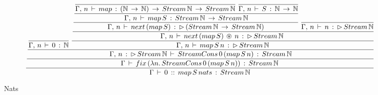 \begin{landscape}
\begin{figure}
\[
\cfrac { \cfrac { \cfrac { \cfrac {  }{ \Gamma ,\, n\, \vdash \, 0\, :\, \mathbb{N} } \, \, \cfrac { \cfrac { \cfrac { \cfrac { \cfrac {  }{ \Gamma ,\, n\, \vdash \, map\, :\, (\mathbb{N}\, \rightarrow \, \mathbb{N})\, \rightarrow \, Stream\, \mathbb{N}\, \rightarrow \, Stream\, \mathbb{N} } \, \, \cfrac {  }{ \Gamma ,\, n\, \vdash \, S\, :\, \mathbb{N}\, \rightarrow \, \mathbb{N} }  }{ \Gamma ,\, n\, \vdash \, map\, S\, :\, Stream\, \mathbb{N}\, \rightarrow \, Stream\, \mathbb{N} }  }{ \Gamma ,\, n\, \vdash \, next\, (map\, S)\, :\, \rhd \, (Stream\, \mathbb{N}\, \rightarrow \, Stream\, \mathbb{N}) } \, \, \cfrac {  }{ \Gamma ,\, n\, \vdash \, n\, :\, \rhd \, Stream\, \mathbb{N} }  }{ \Gamma ,\, n\, \vdash \, next\, (map\, S)\, \circledast \, n\, :\, \rhd \, Stream\, \mathbb{N}\, \,  }  }{ \Gamma ,\, n\, \vdash \, map\, S\, n\, :\, \rhd \, Stream\, \mathbb{N} }  }{ \Gamma ,\, n\, :\, \rhd \, Stream\, \mathbb{N}\, \vdash \, StreamCons\, 0\, (map\, S\, n)\, :\, Stream\, \mathbb{N} }  }{ \Gamma \, \vdash \, fix\, (\lambda n.\, StreamCons\, 0\, (map\, S\, n))\, :\, Stream\, \mathbb{N}\,  }  }{ \Gamma \, \vdash \, 0\, ::\, map\, S\, nats\, :\, Stream\, \mathbb{N} } 
\]
\caption{Nats}
\end{figure}
\end{landscape}
